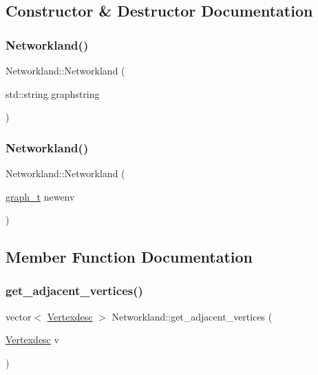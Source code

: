 \subsection{Constructor \& Destructor Documentation}
\mbox{\label{classNetworkland_ad9660d7325a66ec575f4f062d7b8a68e}} 
\subsubsection{\texorpdfstring{Networkland()}{Networkland()}\hspace{0.1cm}{\footnotesize\ttfamily [1/2]}}
{\footnotesize\ttfamily Networkland\+::\+Networkland (\begin{DoxyParamCaption}\item[{std\+::string}]{graphstring }\end{DoxyParamCaption})}

\mbox{\label{classNetworkland_a10c1fd4b0c8855453099235fd2b94248}} 
\subsubsection{\texorpdfstring{Networkland()}{Networkland()}\hspace{0.1cm}{\footnotesize\ttfamily [2/2]}}
{\footnotesize\ttfamily Networkland\+::\+Networkland (\begin{DoxyParamCaption}\item[{\hyperlink{Networkland_8h_a15c13903d8f520e4339ca612a1ee2652}{graph\+\_\+t}}]{newenv }\end{DoxyParamCaption})}



\subsection{Member Function Documentation}
\mbox{\label{classNetworkland_a5cf7695e7ebab3132599be3df75b59f1}} 
\subsubsection{\texorpdfstring{get\+\_\+adjacent\+\_\+vertices()}{get\_adjacent\_vertices()}}
{\footnotesize\ttfamily vector$<$ \hyperlink{Networkland_8h_af340ced64bd0b6914662d1b26be70b41}{Vertexdesc} $>$ Networkland\+::get\+\_\+adjacent\+\_\+vertices (\begin{DoxyParamCaption}\item[{\hyperlink{Networkland_8h_af340ced64bd0b6914662d1b26be70b41}{Vertexdesc}}]{v }\end{DoxyParamCaption})}

